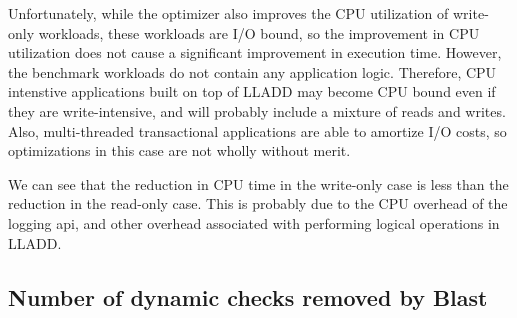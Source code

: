 \documentclass[10pt,letterpaper,twocolumn,english]{article}
\newcommand{\yad}{LLADD\xspace}
\begin{document}
Unfortunately, while the optimizer also improves the CPU utilization of
write-only workloads, these workloads are I/O bound, so the
improvement in CPU utilization does not cause a significant improvement
in execution time.  However, the benchmark workloads do not contain
any application logic.  Therefore, CPU intenstive applications built
on top of \yad may become CPU bound even if they are write-intensive,
and will probably include a mixture of reads and writes.  Also,
multi-threaded transactional applications are able to amortize I/O
costs, so optimizations in this case are not wholly without merit.

We can see that the reduction in CPU time in the write-only case is
less than the reduction in the read-only case.  This is probably due
to the CPU overhead of the logging api, and other overhead associated
with performing logical operations in \yad. 



\subsection{Number of dynamic checks removed by Blast}
\end{document}
